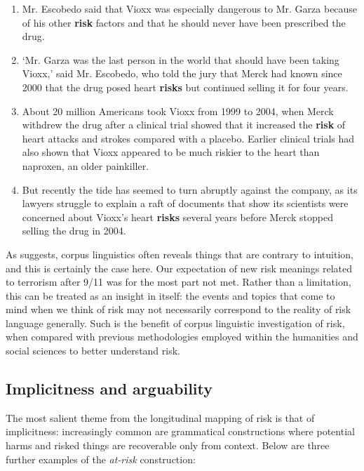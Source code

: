         \begin{enumerate}  [before=\itshape,font=\normalfont] \setlength\itemsep{0em} \small
            \item Mr. Escobedo said that Vioxx was especially dangerous to Mr. Garza because of his other \textbf{risk} factors and that he should never have been prescribed the drug.
            \item `Mr. Garza was the last person in the world that should have been taking Vioxx,' said Mr. Escobedo, who told the jury that Merck had known since 2000 that the drug posed heart \textbf{risks} but continued selling it for four years.
            \item About 20 million Americans took Vioxx from 1999 to 2004, when Merck withdrew the drug after a clinical trial showed that it increased the \textbf{risk} of heart attacks and strokes compared with a placebo. Earlier clinical trials had also shown that Vioxx appeared to be much riskier to the heart than naproxen, an older painkiller.
            \item But recently the tide has seemed to turn abruptly against the company, as its lawyers struggle to explain a raft of documents that show its scientists were concerned about Vioxx's heart \textbf{risks} several years before Merck stopped selling the drug in 2004. 
        \end{enumerate}
     
        As  suggests, corpus linguistics often reveals things that are contrary to intuition, and this is certainly the case here. Our expectation of new risk meanings related to terrorism after 9\slash 11 was for the most part not met. Rather than a limitation, this can be treated as an insight in itself: the events and topics that come to mind when we think of risk may not necessarily correspond to the reality of risk language generally. Such is the benefit of corpus linguistic investigation of risk, when compared with previous methodologies employed within the humanities and social sciences to better understand risk.

    \subsection{Implicitness and arguability}

	   The most salient theme from the longitudinal mapping of risk is that of implicitness: increasingly common are grammatical constructions where potential harms and risked things are recoverable only from context. Below are three further examples of the \emph{at-risk} construction:

